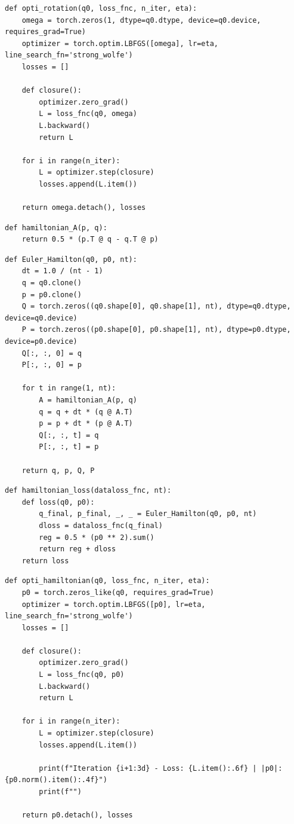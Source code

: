 \documentclass[12pt]{report}
\begin{document}
\begin{lstlisting}[caption=Fonction opti\_rotation, label=code:opti_rotation]
def opti_rotation(q0, loss_fnc, n_iter, eta):
    omega = torch.zeros(1, dtype=q0.dtype, device=q0.device, requires_grad=True)
    optimizer = torch.optim.LBFGS([omega], lr=eta, line_search_fn='strong_wolfe')
    losses = []

    def closure():
        optimizer.zero_grad()
        L = loss_fnc(q0, omega)
        L.backward()
        return L

    for i in range(n_iter):
        L = optimizer.step(closure)
        losses.append(L.item())

    return omega.detach(), losses
\end{lstlisting}

\begin{lstlisting}[caption=Fonction hamiltonian\_A, label=code:hamiltonianA]
def hamiltonian_A(p, q):
    return 0.5 * (p.T @ q - q.T @ p)
\end{lstlisting}

\begin{lstlisting}[caption=Fonction Euler\_Hamilton, label=code:EulerHamilton]
def Euler_Hamilton(q0, p0, nt):
    dt = 1.0 / (nt - 1)
    q = q0.clone()
    p = p0.clone()
    Q = torch.zeros((q0.shape[0], q0.shape[1], nt), dtype=q0.dtype, device=q0.device)
    P = torch.zeros((p0.shape[0], p0.shape[1], nt), dtype=p0.dtype, device=p0.device)
    Q[:, :, 0] = q
    P[:, :, 0] = p

    for t in range(1, nt):
        A = hamiltonian_A(p, q)
        q = q + dt * (q @ A.T)
        p = p + dt * (p @ A.T)
        Q[:, :, t] = q
        P[:, :, t] = p

    return q, p, Q, P
\end{lstlisting}

\begin{lstlisting}[caption=Fonction hamiltonian\_loss, label=code:hamiltonianloss]
def hamiltonian_loss(dataloss_fnc, nt):
    def loss(q0, p0):
        q_final, p_final, _, _ = Euler_Hamilton(q0, p0, nt)
        dloss = dataloss_fnc(q_final)
        reg = 0.5 * (p0 ** 2).sum()
        return reg + dloss
    return loss
\end{lstlisting}

\begin{lstlisting}[caption=Fonction opti\_hamiltonian, label=code:optihamiltonian]
def opti_hamiltonian(q0, loss_fnc, n_iter, eta):
    p0 = torch.zeros_like(q0, requires_grad=True)
    optimizer = torch.optim.LBFGS([p0], lr=eta, line_search_fn='strong_wolfe')
    losses = []

    def closure():
        optimizer.zero_grad()
        L = loss_fnc(q0, p0)
        L.backward()
        return L

    for i in range(n_iter):
        L = optimizer.step(closure)
        losses.append(L.item())

        print(f"Iteration {i+1:3d} - Loss: {L.item():.6f} | |p0|: {p0.norm().item():.4f}")
        print(f"")

    return p0.detach(), losses
\end{lstlisting}
\end{document}
